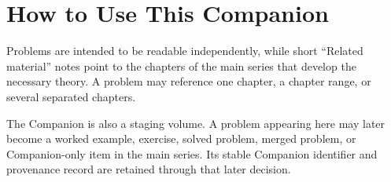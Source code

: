 \chapter*{How to Use This Companion}

Problems are intended to be readable independently, while short ``Related material''
notes point to the chapters of the main series that develop the necessary theory.
A problem may reference one chapter, a chapter range, or several separated chapters.

The Companion is also a staging volume. A problem appearing here may later become a
worked example, exercise, solved problem, merged problem, or Companion-only item in the
main series. Its stable Companion identifier and provenance record are retained through
that later decision.
